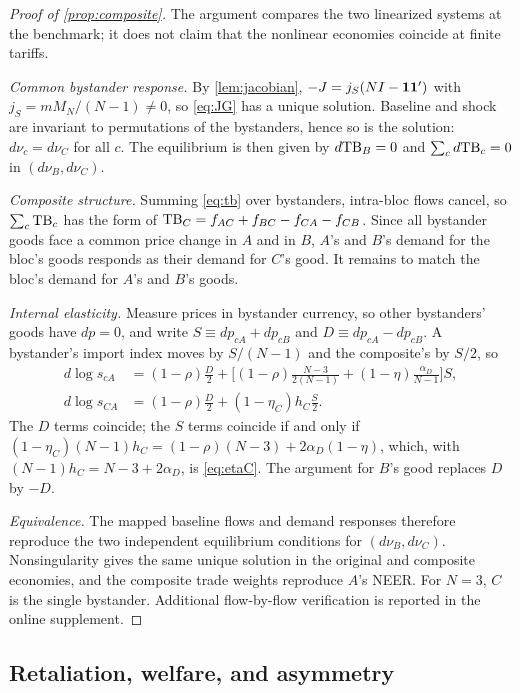 \begin{proof}[Proof of \cref{prop:composite}]
The argument compares the two linearized systems at the benchmark; it does not claim that the nonlinear economies coincide at finite tariffs.

\emph{Common bystander response.} By \cref{lem:jacobian}, $-J=j_S(NI-\mathbf{1}\mathbf{1}')$ with $j_S=mM_N/(N-1)\neq0$, so \cref{eq:JG} has a unique solution. Baseline and shock are invariant to permutations of the bystanders, hence so is the solution: $d\nu_c=d\nu_C$ for all $c$. The equilibrium is then given by $d\mathrm{TB}_B=0$ and $\sum_cd\mathrm{TB}_c=0$ in $(d\nu_B,d\nu_C)$.

\emph{Composite structure.} Summing \cref{eq:tb} over bystanders, intra-bloc flows cancel, so $\sum_c\mathrm{TB}_c$ has the form of $\mathrm{TB}_C=f_{AC}+f_{BC}-f_{CA}-f_{CB}$. Since all bystander goods face a common price change in $A$ and in $B$, $A$'s and $B$'s demand for the bloc's goods responds as their demand for $C$'s good. It remains to match the bloc's demand for $A$'s and $B$'s goods.

\emph{Internal elasticity.} Measure prices in bystander currency, so other bystanders' goods have $dp=0$, and write $S\equiv dp_{cA}+dp_{cB}$ and $D\equiv dp_{cA}-dp_{cB}$. A bystander's import index moves by $S/(N-1)$ and the composite's by $S/2$, so
\begin{equation*}
\begin{aligned}
d\log s_{cA}&=(1-\rho)\frac D2+\Big[(1-\rho)\frac{N-3}{2(N-1)}+(1-\eta)\frac{\alpha_D}{N-1}\Big]S,\\
d\log s_{CA}&=(1-\rho)\frac D2+(1-\eta_C)h_C\frac S2.
\end{aligned}
\end{equation*}
The $D$ terms coincide; the $S$ terms coincide if and only if $(1-\eta_C)(N-1)h_C=(1-\rho)(N-3)+2\alpha_D(1-\eta)$, which, with $(N-1)h_C=N-3+2\alpha_D$, is \cref{eq:etaC}. The argument for $B$'s good replaces $D$ by $-D$.

\emph{Equivalence.} The mapped baseline flows and demand responses therefore reproduce the two independent equilibrium conditions for $(d\nu_B,d\nu_C)$. Nonsingularity gives the same unique solution in the original and composite economies, and the composite trade weights reproduce $A$'s NEER. For $N=3$, $C$ is the single bystander. Additional flow-by-flow verification is reported in the online supplement.
\end{proof}

\subsection{Retaliation, welfare, and asymmetry}

